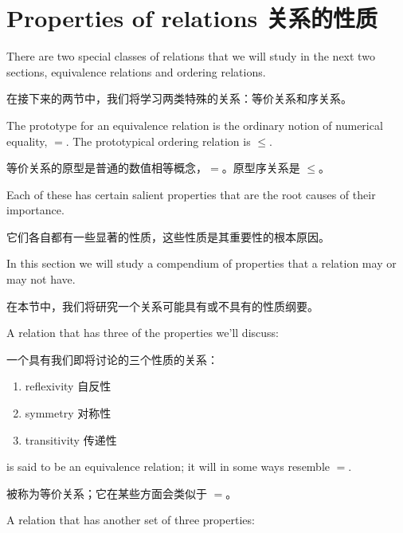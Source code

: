 \newpage






\newpage

\section{Properties of relations 关系的性质}
\label{sec:rel_props}

There are two special classes of relations that we will study
in the next two sections, equivalence relations and ordering relations.

在接下来的两节中，我们将学习两类特殊的关系：等价关系和序关系。

The prototype for an equivalence relation is the ordinary notion
of numerical equality, $=$.  The prototypical ordering relation
is $\leq$.

等价关系的原型是普通的数值相等概念，$=$。原型序关系是 $\leq$。

Each of these has certain salient properties that are the
root causes of their importance.

它们各自都有一些显著的性质，这些性质是其重要性的根本原因。

In this section we will study a 
compendium of properties that a relation may or may not have.

在本节中，我们将研究一个关系可能具有或不具有的性质纲要。

A relation that has three of the properties we'll discuss:

一个具有我们即将讨论的三个性质的关系：

\begin{enumerate}
\item {} reflexivity 
\noindent  {} 自反性
\item {}symmetry 
\noindent  {}对称性
\item {}transitivity
\noindent  {}传递性
\end{enumerate}

\noindent is said to be an equivalence relation;
it will in some ways resemble
$=$.

\noindent 被称为等价关系；它在某些方面会类似于 $=$。

A relation that has another set of three properties:

